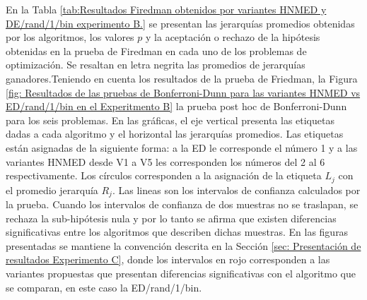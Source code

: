 En la Tabla \ref{tab:Resultados Firedman obtenidos por variantes HNMED y DE/rand/1/bin  experimento B.} se presentan las jerarquías promedios obtenidas por los algoritmos, los valores $p$ y la aceptación o rechazo de la hipótesis obtenidas en la prueba de Firedman en cada uno de los problemas de optimización. Se resaltan en letra negrita las promedios de jerarquías ganadores.Teniendo en cuenta los resultados de la prueba de Friedman, la Figura \ref{fig: Resultados de las pruebas de Bonferroni-Dunn para las variantes HNMED vs ED/rand/1/bin en el Experitmento B} la prueba post hoc de Bonferroni-Dunn para los seis problemas. En las gráficas, el eje vertical presenta las etiquetas dadas a cada algoritmo y el horizontal las jerarquías promedios. Las etiquetas están asignadas de la siguiente forma: a la ED le corresponde el número 1 y a las variantes HNMED desde V1 a V5 les corresponden los números del 2 al 6 respectivamente. Los círculos corresponden a la asignación de la etiqueta $L_j$ con el promedio jerarquía  $R_j$. Las lineas son los intervalos de confianza calculados por la prueba. Cuando los intervalos de confianza de dos muestras no se traslapan, se rechaza la sub-hipótesis nula y por lo tanto se afirma que existen diferencias significativas entre los algoritmos que describen dichas muestras. En las figuras presentadas se mantiene la convención descrita en la Sección \ref{sec: Presentación de resultados Experimento C}, donde  los intervalos en rojo corresponden a las variantes propuestas que presentan diferencias significativas con el algoritmo que se comparan, en este caso la ED/rand/1/bin. 

